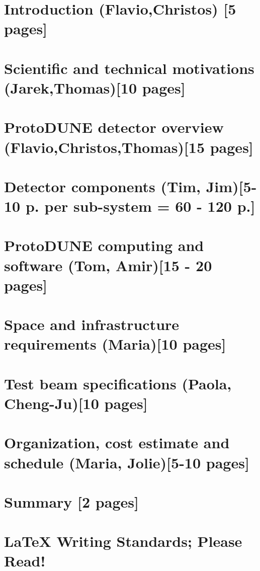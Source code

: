\ifdefined\isfinal\documentclass[final]{pd-tdr}\else\documentclass{pd-tdr}\fi
\begin{document}
%
%
%
%
%

\chapter{Introduction {\color{red} (Flavio,Christos) [5 pages]}}
%

\chapter{Scientific and technical motivations {\color{red} (Jarek,Thomas)[10 pages]}}
%

\chapter{ProtoDUNE detector overview {\color{red} (Flavio,Christos,Thomas)[15 pages]}}
%

\chapter{Detector components {\color{red} (Tim, Jim)[5-10 p. per sub-system = 60 - 120 p.]}}


\chapter{ProtoDUNE computing and software {\color{red} (Tom, Amir)[15 - 20 pages]}}
%

\chapter{Space and infrastructure requirements {\color{red} (Maria)[10 pages]}}
%

\chapter{Test beam specifications {\color{red} (Paola, Cheng-Ju)[10 pages]}} 
%

\chapter{Organization, cost estimate and schedule {\color{red}  (Maria, Jolie)[5-10 pages]}}
%



%
% 


\newpage
\chapter{Summary {\color{red}[2 pages]}}

\appendix

\chapter{LaTeX Writing Standards; Please Read!}
%



\cleardoublepage

%
\end{document}
